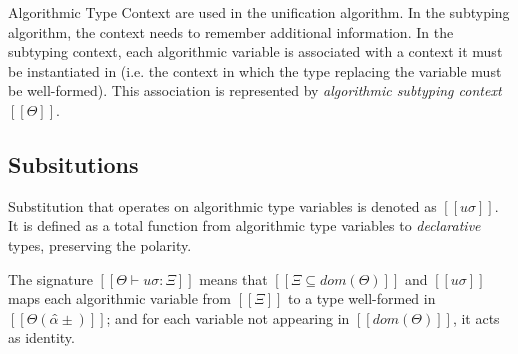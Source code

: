 \documentclass[acmsmall,natbib=false,review,anonymous]{acmart}
\begin{document}
\begin{algorithm}
  \hfill
  
  \begin{multicols}{2}
  \ottdefnWFATNauWFLabeled{}
  \columnbreak

  \ottdefnWFATPauWFLabeled{}
  \end{multicols}

\end{algorithm}


Algorithmic Type Context are used in the unification algorithm.
In the subtyping algorithm, 
the context needs to remember additional information.
In the subtyping context, each algorithmic variable is associated with a
context it must be instantiated in 
(i.e. the context in which the type replacing the variable must be well-formed).
This association is represented by \emph{algorithmic subtyping context} $[[Θ]]$.


\subsection{Subsitutions}

Substitution that operates on algorithmic type variables is denoted as
$[[uσ]]$. It is defined as a total function from algorithmic 
type variables to \emph{declarative} types, preserving the polarity.

The signature $[[Θ ⊢ uσ : Ξ]]$ means that
$[[Ξ ⊆ dom(Θ)]]$ and 
$[[uσ]]$ maps each algorithmic variable 
from $[[Ξ]]$ to a type well-formed in $[[Θ(α̂±)]]$;
and for each variable not appearing in $[[dom(Θ)]]$, 
it acts as identity.
\end{document}
